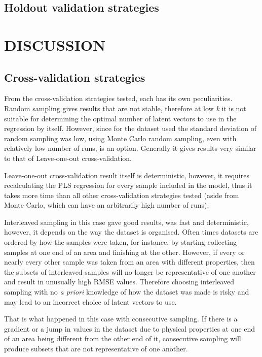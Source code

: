 \documentclass{isprs}
\begin{document}
\subsection{Holdout validation strategies}\label{sec:Holdout validation strategies 2}



\section{DISCUSSION}\label{sec:DISCUSSION}

\subsection{Cross-validation strategies}\label{sec:Cross-validation strategies 3}

From the cross-validation strategies tested, each has its own peculiarities. Random sampling gives results that are not stable, therefore at low \textit{k} it is not suitable for determining the optimal number of latent vectors to use in the regression by itself. However, since for the dataset used the standard deviation of random sampling was low, using Monte Carlo random sampling, even with relatively low number of runs, is an option. Generally it gives results very similar to that of Leave-one-out cross-validation.

Leave-one-out cross-validation result itself is deterministic, however, it requires recalculating the PLS regression for every sample included in the model, thus it takes more time than all other cross-validation strategies tested (aside from Monte Carlo, which can have an arbitrarily high number of runs).

Interleaved sampling in this case gave good results, was fast and deterministic, however, it depends on the way the dataset is organised. Often times datasets are ordered by how the samples were taken, for instance, by starting collecting samples at one end of an area and finishing at the other. However, if every or nearly every other sample was taken from an area with different properties, then the subsets of interleaved samples will no longer be representative of one another and result in unusually high RMSE values. Therefore choosing interleaved sampling with no \textit{a priori} knowledge of how the dataset was made is risky and may lead to an incorrect choice of latent vectors to use.

That is what happened in this case with consecutive sampling. If there is a gradient or a jump in values in the dataset due to physical properties at one end of an area being different from the other end of it, consecutive sampling will produce subsets that are not representative of one another.
\end{document}
